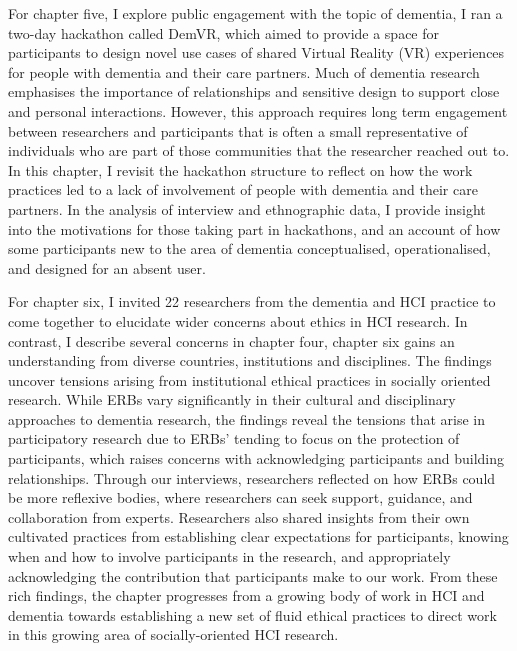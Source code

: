 For chapter five, I explore public engagement with the topic of dementia, I ran a two-day hackathon called DemVR, which aimed to provide a space for participants to design novel use cases of shared Virtual Reality (VR) experiences for people with dementia and their care partners. Much of dementia research emphasises the importance of relationships and sensitive design to support close and personal interactions. However, this approach requires long term engagement between researchers and participants that is often a small representative of individuals who are part of those communities that the researcher reached out to. In this chapter, I revisit the hackathon structure to reflect on how the work practices led to a lack of involvement of people with dementia and their care partners. In the analysis of interview and ethnographic data, I provide insight into the motivations for those taking part in hackathons, and an account of how some participants new to the area of dementia conceptualised, operationalised, and designed for an absent user. 

For chapter six, I invited 22 researchers from the dementia and HCI practice to come together to elucidate wider concerns about ethics in HCI research. In contrast, I describe several concerns in chapter four, chapter six gains an understanding from diverse countries, institutions and disciplines. The findings uncover tensions arising from institutional ethical practices in socially oriented research. While ERBs vary significantly in their cultural and disciplinary approaches to dementia research, the findings reveal the tensions that arise in participatory research due to ERBs’ tending to focus on the protection of participants, which raises concerns with acknowledging participants and building relationships. Through our interviews, researchers reflected on how ERBs could be more reflexive bodies, where researchers can seek support, guidance, and
collaboration from experts. Researchers also shared insights from their own cultivated practices from establishing clear expectations for participants, knowing when and how to involve participants in the research, and appropriately acknowledging the contribution that participants make to our work. From these rich findings, the chapter progresses from a growing body of work in HCI and dementia towards establishing a new set of fluid ethical practices to direct work in this growing area of socially-oriented HCI research.

